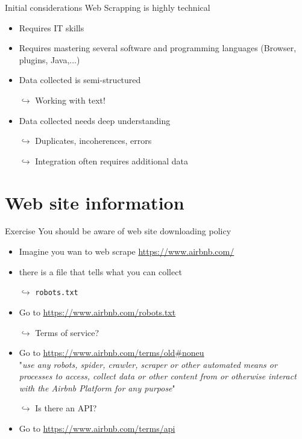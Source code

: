 \documentclass[xcolor=x11names,compress]{beamer}
\renewcommand{\(}{\begin{columns}}
\renewcommand{\)}{\end{columns}}
\newcommand{\<}[1]{\begin{column}{#1}}
\renewcommand{\>}{\end{column}}
\begin{document}
\begin{frame}{Initial considerations}
Web Scrapping is highly technical
\pause
\begin{itemize}[<+->]
    \item Requires IT skills
    \item Requires mastering several software  and programming languages (Browser, plugins, Java,...)
    \item Data collected is semi-structured
    \item[$\hookrightarrow$]  Working with text!
    \item Data collected needs deep understanding
    \item[$\hookrightarrow$]  Duplicates, incoherences, errors
    \item[$\hookrightarrow$ ] Integration often requires additional data
\end{itemize}
\end{frame}

\section{Web site information}

\begin{frame}{Exercise}
You should be aware of  web site downloading policy
\pause
\begin{itemize}[<+->]
    \item Imagine you wan to web scrape \href{https://www.airbnb.com/}{https://www.airbnb.com/}
    \item there is a file that tells what you can collect
    \item[$\hookrightarrow$] \texttt{robots.txt}
    \item Go to \href{https://www.airbnb.com/robots.txt}{https://www.airbnb.com/robots.txt}
    \item[$\hookrightarrow$] Terms of service?
    \item Go to \url{https://www.airbnb.com/terms/old\#noneu} \\
    \footnotesize{"\emph{use any robots, spider, crawler, scraper or other automated means or processes to access, collect data or other content from or otherwise interact with the Airbnb Platform for any purpose}"}
     \item[$\hookrightarrow$] Is there an API?
    \item Go to \href{https://www.airbnb.com/terms/api}{https://www.airbnb.com/terms/api}

\end{itemize}
\end{frame}
\end{document}
